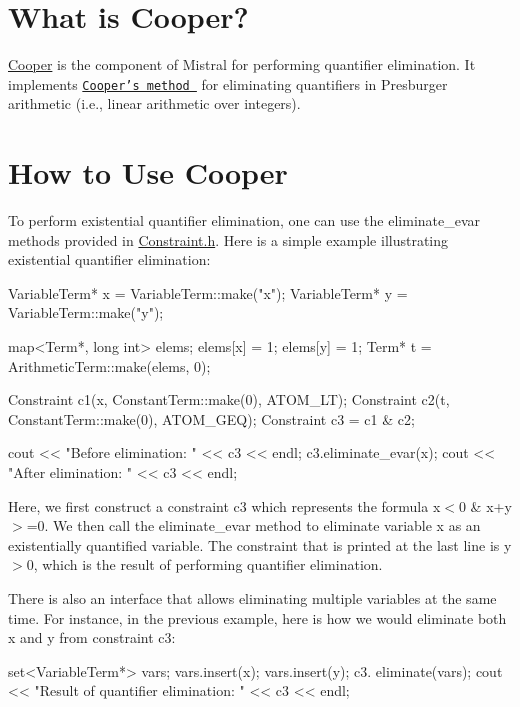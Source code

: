 \hypertarget{cooper_cooper-intro}{}\section{\-What is Cooper?}\label{cooper_cooper-intro}
\hyperlink{classCooper}{\-Cooper} is the component of \-Mistral for performing quantifier elimination. \-It implements \href{http://www.cs.wm.edu/~idillig/cs780-02/Cooper.pdf}{\tt \-Cooper's method } for eliminating quantifiers in \-Presburger arithmetic (i.\-e., linear arithmetic over integers).\hypertarget{cooper_cooper-use}{}\section{\-How to Use Cooper}\label{cooper_cooper-use}
\-To perform existential quantifier elimination, one can use the eliminate\-\_\-evar methods provided in \hyperlink{Constraint_8h_source}{\-Constraint.\-h}. \-Here is a simple example illustrating existential quantifier elimination\-:

\begin{DoxyVerb}
VariableTerm* x = VariableTerm::make("x");
VariableTerm* y = VariableTerm::make("y");

map<Term*, long int> elems;
elems[x] = 1;
elems[y] = 1;
Term* t = ArithmeticTerm::make(elems, 0);

Constraint c1(x, ConstantTerm::make(0), ATOM_LT);
Constraint c2(t, ConstantTerm::make(0), ATOM_GEQ);
Constraint c3 = c1 & c2;

cout << "Before elimination: " << c3 << endl;
c3.eliminate_evar(x);
cout << "After elimination: " << c3 << endl;
\end{DoxyVerb}


\-Here, we first construct a constraint c3 which represents the formula x$<$0 \& x+y $>$=0. \-We then call the eliminate\-\_\-evar method to eliminate variable x as an existentially quantified variable. \-The constraint that is printed at the last line is y$>$0, which is the result of performing quantifier elimination.

\-There is also an interface that allows eliminating multiple variables at the same time. \-For instance, in the previous example, here is how we would eliminate both x and y from constraint c3\-:

\begin{DoxyVerb}
set<VariableTerm*> vars;
vars.insert(x);
vars.insert(y);
c3. eliminate(vars);
cout << "Result of quantifier elimination: " << c3 << endl;
\end{DoxyVerb}


